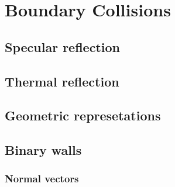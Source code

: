 \section{Boundary Collisions}
\subsection{Specular reflection}
\subsection{Thermal reflection}
\subsection{Geometric represetations}
\subsection{Binary walls}
\subsubsection{Normal vectors}
